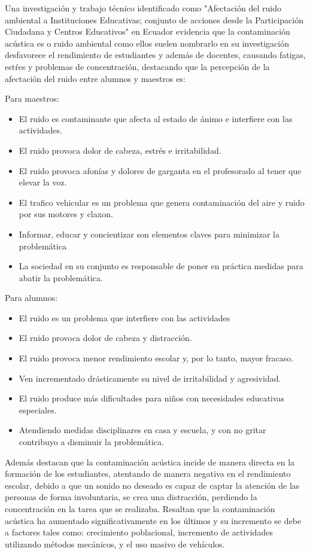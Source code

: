 {{Una investigación y trabajo técnico identificado como "Afectación del ruido ambiental a Instituciones Educativas; conjunto de acciones desde la Participación Ciudadana y Centros Educativos" en Ecuador evidencia que la contaminación acústica es o ruido ambiental como ellos suelen nombrarlo en su investigación desfavorece el rendimiento de estudiantes y además de docentes, causando fatigas, estŕes y problemas de concentración, destacando que la percepción de la afectación del ruido entre alumnos y maestros es:

Para maestros:
\begin{itemize}
\sloppy
    \item El ruido es contaminante que afecta al estado de ánimo e  interfiere con las actividades.
    \item El ruido provoca dolor de cabeza, estrés e irritabilidad.
    \item El ruido provoca afonías y dolores de garganta en el  profesorado al tener que elevar la voz.
    \item El trafico vehicular es un problema que genera contaminación del aire y ruido por sus motores y claxon.
    \item Informar, educar y concientizar son elementos claves para minimizar la problemática
    \item La sociedad en su conjunto es responsable de poner en práctica medidas para abatir la problemática.
\end{itemize}

Para alumnos:
\begin{itemize}
\sloppy
    \item El ruido es un problema que interfiere con las actividades
    \item El ruido provoca dolor de cabeza y distracción.
    \item El ruido provoca menor rendimiento escolar y, por lo  tanto, mayor fracaso.
    \item Ven incrementado drásticamente su nivel de irritabilidad  y agresividad.
    \item El ruido produce más dificultades para niños con necesidades educativas especiales.
    \item Atendiendo medidas disciplinares en casa y escuela, y con  no gritar contribuyo a disminuir la problemática.
\end{itemize}

Además destacan que la contaminación acústica incide de manera directa en la formación de los estudiantes, atentando de manera negativa en el rendimiento escolar, debido a que un sonido no deseado es capaz de captar la atención de las personas de forma involuntaria, se crea una distracción, perdiendo la concentración en la tarea que se realizaba. Resaltan que la contaminación acústica ha aumentado significativamente en los últimos y su incremento se debe a factores tales como: crecimiento poblacional, incremento de actividades utilizando métodos mecánicos, y el uso masivo de vehículos. 

}}
